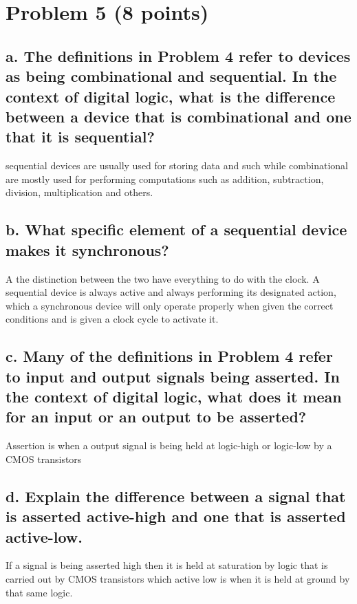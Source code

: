 \documentclass{article}
\begin{document}
\section*{Problem 5 (8 points)}
\subsection*{a. The definitions in Problem 4 refer to devices as being combinational and sequential. In  the  context  of  digital  logic,  what  is  the  difference  between  a  device  that  is combinational and one that it is sequential?}
\begin{center}
    sequential devices are usually used for storing data and such while combinational are mostly used for performing computations such as addition, subtraction, division, multiplication and others.
\end{center}
\subsection*{b.  What specific element of a sequential device makes it synchronous?}
\begin{center}
    A the distinction between the two have everything to do with the clock. A sequential device is always active and always performing its designated action, which a synchronous device will only operate properly when given the correct conditions and is given a clock cycle to activate it.
\end{center}
\subsection*{c.   Many of the definitions in Problem 4 refer to input and output signals being asserted. In  the  context  of  digital  logic,  what  does  it  mean  for  an  input  or  an  output  to  be asserted?}
\begin{center}
    Assertion is when a output signal is being held at logic-high or logic-low by a CMOS transistors
\end{center}
\subsection*{d.  Explain the  difference between a  signal that  is asserted active-high  and  one  that is asserted active-low.}
\begin{center}
    If a signal is being asserted high then it is held at saturation by logic that is carried out by CMOS transistors which active low is when it is held at ground by that same logic.
\end{center}
\newpage
\end{document}
